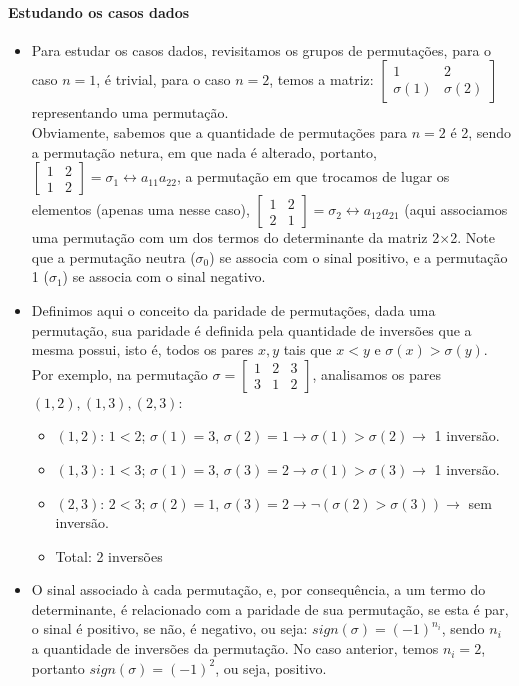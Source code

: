 \documentclass[12pt]{article}
\begin{document}
\paragraph{Estudando os casos dados}
\begin{itemize}
	\item Para estudar os casos dados, revisitamos os grupos de permutações, para o caso $n = 1$, é trivial, para o caso $n=2$, temos a matriz:
	$\begin{bmatrix} 1 & 2 \\ \sigma(1) & \sigma(2) \end{bmatrix}$ representando uma permutação.\\[10pt]
	Obviamente, sabemos que a quantidade de permutações para $n=2$ é 2, sendo a permutação netura, em que nada é alterado, portanto, $\begin{bmatrix} 1 & 2 \\ 1 & 2 \end{bmatrix} = \sigma_1 \leftrightarrow a_{11}a_{22}$, a permutação em que trocamos de lugar os elementos (apenas uma nesse caso), $\begin{bmatrix} 1 & 2 \\ 2 & 1 \end{bmatrix} = \sigma_2 \leftrightarrow a_{12}a_{21}$ (aqui associamos uma permutação com um dos termos do determinante da matriz 2$\times$2. Note que a permutação neutra ($\sigma_0$) se associa com o sinal positivo, e a permutação 1 ($\sigma_1$) se associa com o sinal negativo.

	\item Definimos aqui o conceito da paridade de permutações, dada uma permutação, sua paridade é definida pela quantidade de inversões que a mesma possui, isto é, todos os pares $x,y$ tais que $x < y$ e $\sigma(x) > \sigma(y)$. Por exemplo, na permutação $\sigma = \begin{bmatrix} 1 & 2 & 3 \\ 3 & 1 & 2 \end{bmatrix}$, analisamos os pares $(1,2),(1,3),(2,3)$:
	\begin{itemize}
		\item $(1,2)$: $1 < 2$; $\sigma(1) = 3$, $\sigma(2) = 1 \rightarrow \sigma(1) > \sigma(2) \rightarrow$  1 inversão.
		\item $(1,3)$: $1 < 3$; $\sigma(1) = 3$, $\sigma(3) = 2 \rightarrow \sigma(1) > \sigma(3) \rightarrow$  1 inversão.
		\item $(2,3)$: $2 < 3$; $\sigma(2) = 1$, $\sigma(3) = 2 \rightarrow \neg (\sigma(2)>\sigma(3)) \rightarrow$ sem inversão.
		\item Total: 2 inversões
	\end{itemize}
		
	\item O sinal associado à cada permutação, e, por consequência, a um termo do determinante, é relacionado com a paridade de sua permutação, se esta é par, o sinal é positivo, se não, é negativo, ou seja: $sign(\sigma)=(-1)^{n_i}$, sendo $n_i$ a quantidade de inversões da permutação. No caso anterior, temos $n_i = 2$, portanto $sign(\sigma) = (-1)^2$, ou seja, positivo.	
\end{itemize}
\end{document}
